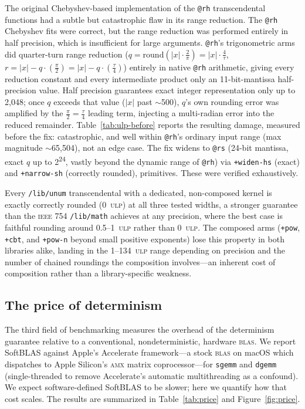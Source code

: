 \documentclass[twoside]{article}
\begin{document}
The original Chebyshev-based implementation of the \texttt{@rh} transcendental functions had a subtle but catastrophic flaw in its range reduction.  The \texttt{@rh} Chebyshev fits were correct, but the range reduction was performed entirely in half precision, which is insufficient for large arguments.  \texttt{@rh}'s trigonometric arms did quarter-turn range reduction ($q=\mathrm{round}(|x|\cdot\frac{\text{2}}{\pi})=|x|\cdot\frac{\text{4}}{\tau}$, $r=|x|-q\cdot(\frac{\pi}{\text{2}})=|x|-q\cdot(\frac{\tau}{\text{4}})$) entirely in native \texttt{@rh} arithmetic, giving every reduction constant and every intermediate product only an 11-bit-mantissa half-precision value.  Half precision guarantees exact integer representation only up to 2,048; once $q$ exceeds that value ($|x|$ past $\sim$500), $q$'s own rounding error was amplified by the $\frac{\pi}{\text{2}}=\frac{\tau}{\text{4}}$ leading term, injecting a multi-radian error into the reduced remainder.  Table~\ref{tab:ulp-before} reports the resulting damage, measured before the fix: catastrophic, and well within \texttt{@rh}'s ordinary input range (max magnitude $\sim$65,504), not an edge case.  The fix widens to \texttt{@rs} (24-bit mantissa, exact $q$ up to 2\textsuperscript{24}, vastly beyond the dynamic range of \texttt{@rh}) via \texttt{+widen-hs} (exact) and \texttt{+narrow-sh} (correctly rounded), primitives.  These were verified exhaustively.

Every \texttt{/lib/unum} transcendental with a dedicated, non-composed kernel is exactly correctly rounded (0~\textsc{ulp}) at all three tested widths, a stronger guarantee than the \textsc{ieee} 754 \texttt{/lib/math} achieves at any precision, where the best case is faithful rounding around 0.5--1~\textsc{ulp} rather than 0~\textsc{ulp}.  The composed arms (\texttt{+pow}, \texttt{+cbt}, and \texttt{+pow-n} beyond small positive exponents) lose this property in both libraries alike, landing in the 1--134~\textsc{ulp} range depending on precision and the number of chained roundings the composition involves---an inherent cost of composition rather than a library-specific weakness.

\subsection{The price of determinism}
\label{sec:price}

The third field of benchmarking measures the overhead of the determinism guarantee relative to a conventional, nondeterministic, hardware \textsc{blas}.  We report SoftBLAS against Apple's Accelerate framework---a stock \textsc{blas} on macOS which dispatches to Apple Silicon's \textsc{amx} matrix coprocessor---for \texttt{sgemm} and \texttt{dgemm} (single-threaded to remove Accelerate's automatic multithreading as a confound).  We expect software-defined SoftBLAS to be slower; here we quantify how that cost scales.  The results are summarized in Table~\ref{tab:price} and Figure~\ref{fig:price}.
\end{document}
